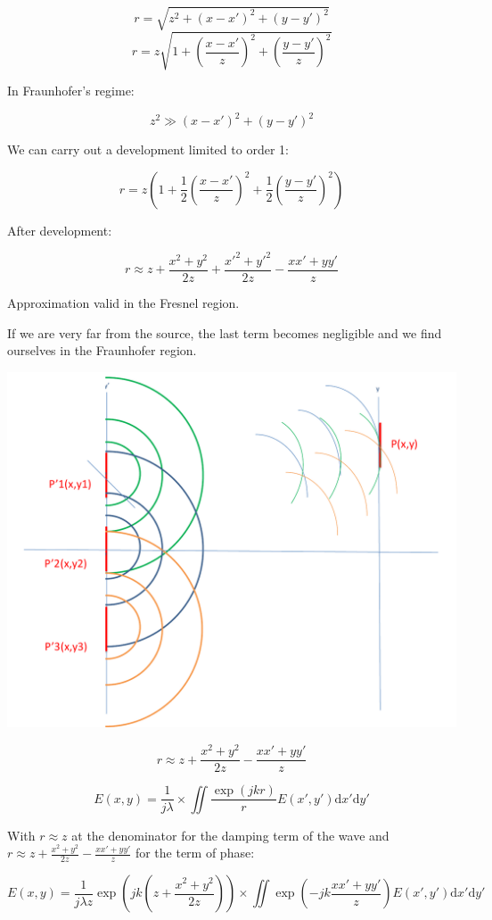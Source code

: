 \documentclass[10pt,a4paper]{article}
\begin{document}
\[r=\sqrt{z^2+(x-x')^2+(y-y')^2}\]
\[r=z\sqrt{1+\left(\frac{x-x'}{z}\right)^2+\left(\frac{y-y'}{z}\right)^2}\]

In Fraunhofer’s regime:

\[z^2\gg(x-x')^2+(y-y')^2\]

We can carry out a development limited to order 1: 

\[r=z\left(1+\frac{1}{2}\left(\frac{x-x'}{z}\right)^2+\frac{1}{2}\left(\frac{y-y'}{z}\right)^2\right)\]

After development:

\[r \approx z+\frac{x^2+y^2}{2z}+\frac{x'^2+y'^2}{2z}-\frac{xx'+yy'}{z}\]

Approximation valid in the Fresnel region. 

If we are very far from the source, the last term becomes negligible and we find ourselves in the Fraunhofer region.

\begin{center}
\includegraphics[scale=0.32]{../Ressources/schema-3-crop.png}
\end{center}

\[r \approx z+\frac{x^2+y^2}{2z}-\frac{xx'+yy'}{z}\]

\[
E(x,y)=\frac{1}{j\lambda} 
\times \iint \frac{\exp\left(jkr\right)}{r}
E(x',y')\mathrm{d}x'\mathrm{d}y'
\]

With $r\approx z$ at the denominator for the damping term of the wave and $r \approx z+\frac{x^2+y^2}{2z}-\frac{xx'+yy'}{z}$ for the term of phase:

\[
E(x,y)=\frac{1}{j\lambda z} \exp\left(jk\left(z+\frac{x^2+y^2}{2z}\right)\right)
\times \iint \exp\left(-jk\frac{xx'+yy'}{z}\right)
E(x',y')\mathrm{d}x'\mathrm{d}y'
\]
\end{document}
